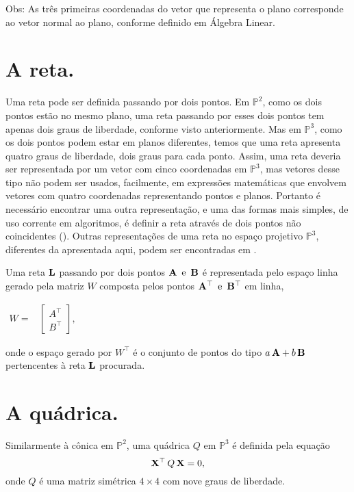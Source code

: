 Obs: As três primeiras coordenadas do vetor que representa o plano corresponde ao vetor normal ao plano, conforme definido em Álgebra Linear.
\section*{A reta.}

Uma reta pode ser definida passando por dois pontos. Em $\mathbb{P}^2$, como os dois pontos estão no mesmo plano, uma reta passando por esses dois pontos tem apenas dois graus de liberdade, conforme visto anteriormente. Mas em $\mathbb{P}^3$, como os dois pontos podem estar em planos diferentes, temos que uma reta apresenta quatro graus de liberdade, dois graus para cada ponto. Assim, uma reta deveria ser representada por um vetor com cinco coordenadas em $\mathbb{P}^3$, mas vetores desse tipo não podem ser usados, facilmente, em expressões matemáticas que envolvem vetores com quatro coordenadas representando pontos e planos. Portanto é necessário encontrar uma outra representação, e uma das formas mais simples, de uso corrente em algoritmos, é definir a reta através de dois pontos não coincidentes (\cite{bib:kuang}). Outras representações de uma reta no espaço projetivo $\mathbb{P}^3$, diferentes da apresentada aqui, podem ser encontradas em \cite{Hartley2004}.


Uma reta ${\bf L}$ passando por dois pontos ${\bf A} \,\,\, \text{e} \,\,\, {\bf B}$ é representada pelo espaço linha gerado pela matriz $W$ composta pelos pontos ${\bf A}^\top \,\,\,\text{e} \,\,\, {\bf B}^\top$ em linha,
\begin{center}
$
\begin{array}{cc}
W = 
& \begin{bmatrix}
  A^\top\\
  B^\top
  \end{bmatrix},
\end{array}
$
\end{center}
onde o espaço gerado por $W^\top$ é o conjunto de pontos do tipo $a\,{\bf A} + b\,{\bf B}$ pertencentes à reta ${\bf L}$ procurada.
\section*{A quádrica.}


Similarmente à cônica em $\mathbb{P}^2$, uma quádrica $Q$ em $\mathbb{P}^3$ é definida pela equação
\begin{equation*}
\mathbf{X}^\top\,Q\,\mathbf{X} = 0,
\end{equation*}
onde $Q$ é uma matriz simétrica $4\times4$ com nove graus de liberdade.

